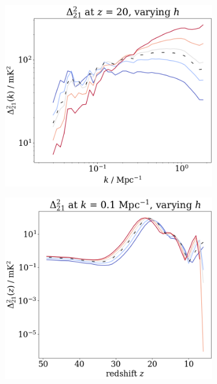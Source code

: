 \documentclass[floats,floatfix,showpacs,amssymb,prd,superscriptaddress,nofootinbib, 11pt]{revtex4-2} %
\begin{document}
\begin{figure}[H]
\begin{subfigure}[b]{0.45\textwidth}
         \includegraphics[width=\textwidth]{images/simulation_results/power_spectrum_fixed_z_20_h.png}
         \label{fig:power_spectrum_fixed_z_20_h}
     \end{subfigure}
     \hfill
     \begin{subfigure}[b]{0.45\textwidth}
         \centering
         \includegraphics[width=\textwidth]{images/simulation_results/power_spectrum_fixed_k_0.1_h.png}
         \label{fig:power_spectrum_fixed_k_0.1_h}

\end{subfigure}
\end{figure}
\end{document}
